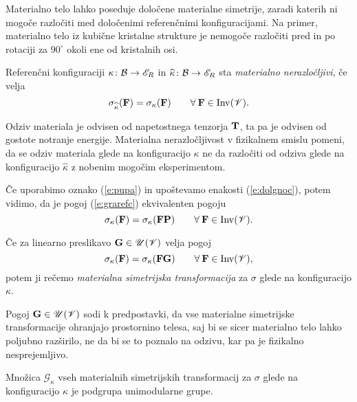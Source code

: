 Materialno telo lahko poseduje določene materialne simetrije, zaradi katerih ni mogoče razločiti
med določenimi referenčnimi konfiguracijami. Na primer, materialno telo iz
kubične kristalne strukture je nemogoče razločiti pred in po rotaciji za
$90^{\circ}$ okoli ene od kristalnih osi.

\begin{definicija}
	Referenčni konfiguraciji $\kappa\colon\mathcal B\to\mathscr E_R$ in $\widehat{\kappa}\colon\mathcal B\to\mathscr E_R$
	sta \emph{materialno nerazločljivi}, če velja
	\begin{equation} \label{e:grarefc}
		\sigma_{\widehat{\kappa}}(\mathbf F)=\sigma_{\kappa}(\mathbf F)
		\qquad\forall\:\mathbf F\in\mathrm{Inv}(\mathscr V).
	\end{equation}
\end{definicija}

Odziv materiala je odvisen od napetostnega tenzorja $\mathbf T$, ta pa je odvisen
od gostote notranje energije.
Materialna nerazločljivost v fizikalnem smislu pomeni, da se odziv materiala
glede na konfiguracijo $\kappa$ ne da razločiti od odziva glede na konfiguracijo
$\widehat{\kappa}$ z nobenim mogočim eksperimentom.

Če uporabimo oznako (\ref{e:pupa}) in upoštevamo enakosti (\ref{e:dolgnoc}),
potem vidimo, da je pogoj (\ref{e:grarefc}) ekvivalenten pogoju
\begin{equation*}
	\sigma_{\kappa}(\mathbf F)=\sigma_{\kappa}(\mathbf F\mathbf P)\qquad
	\forall\:\mathbf F\in\mathrm{Inv}(\mathscr V).
\end{equation*}

\begin{definicija}
	Če za linearno preslikavo $\mathbf G\in\mathscr{U}(\mathscr V)$ velja pogoj
	\begin{equation} \label{e:pogir}
		\sigma_{\kappa}(\mathbf F)=\sigma_{\kappa}(\mathbf F\mathbf G)\qquad
		\forall\:\mathbf F\in\mathrm{Inv}(\mathscr V),
	\end{equation}
	potem ji rečemo \emph{materialna simetrijska transformacija} za $\sigma$ glede na konfiguracijo $\kappa$.
\end{definicija}

Pogoj $\mathbf G\in\mathscr{U}(\mathscr V)$ sodi k predpostavki,
da vse materialne simetrijske transformacije ohranjajo prostornino telesa,
saj bi se sicer materialno telo lahko poljubno razši\-rilo, ne da bi se to poznalo na odzivu,
kar pa je fizikalno nesprejemljivo.

\begin{izrek}
	Množica $\mathcal{G}_{\kappa}$ vseh materialnih simetrijskih transformacij za $\sigma$ glede
	na konfiguracijo $\kappa$ je podgrupa unimodularne grupe.
\end{izrek}

